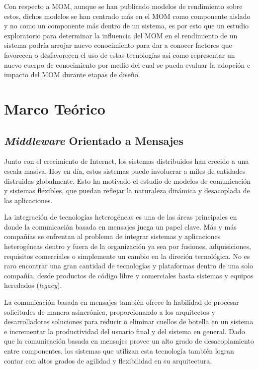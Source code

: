 \documentclass[11pt, twoside]{report}
\begin{document}
Con respecto a MOM, aunque se han publicado modelos de rendimiento sobre estos\cite{martince-et-al}, dichos modelos se han centrado más en el MOM como componente aislado y no como un componente más dentro de un sistema, es por esto que un estudio exploratorio para determinar la influencia del MOM en el rendimiento de un sistema podría arrojar nuevo conocimiento para dar a conocer factores que favorecen o desfavorecen el uso de estas tecnologías así como representar un nuevo cuerpo de conocimiento por medio del cual se pueda evaluar la adopción e impacto del MOM durante etapas de diseño. 


\chapter{Marco Teórico}

\section{\emph{Middleware} Orientado a Mensajes}

Junto con el crecimiento de Internet, los sistemas distribuidos han crecido a una escala masiva. Hoy en día, estos sistemas puede involucrar a miles de entidades distruidas globalmente. Esto ha motivado el estudio de modelos de comunicación y sistemas flexibles, que puedan reflejar la naturaleza dinámica y desacoplada de las aplicaciones.

La integración de tecnologías heterogéneas es una de las áreas principales en donde la comunicación basada en mensajes juega un papel clave. Más y más compañías se enfrentan al problema de integrar sistemas y aplicaciones heterogéneas dentro y fuera de la organización ya sea por fusiones, adquisiciones, requisitos comerciales o simplemente un cambio en la direción tecnológica. No es raro encontrar una gran cantidad de tecnologías y plataformas dentro de una solo compañía, desde productos de código libre y comerciales hasta sistemas y equipos heredados (\emph{legacy}).

La comunicación basada en mensajes también ofrece la habilidad de procesar solicitudes de manera asincrónica, proporcionando a los arquitectos y desarrolladores soluciones para reducir o eliminar cuellos de botella en un sistema e incrementar la productividad del usuario final y del sistema en general. Dado que la comunicación basada en mensajes provee un alto grado de desacoplamiento entre componentes, los sistemas que utilizan esta tecnología también logran contar con altos grados de agilidad y flexibilidad en su arquitectura.
\end{document}
